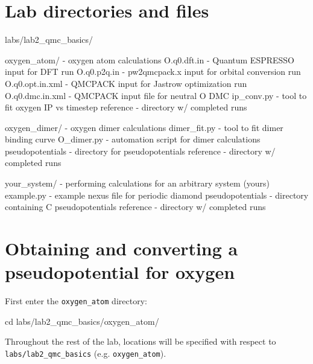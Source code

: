 \section{Lab directories and files}

\begin{shade}
labs/lab2_qmc_basics/

   oxygen_atom/             - oxygen atom calculations 
       O.q0.dft.in          - Quantum ESPRESSO input for DFT run
       O.q0.p2q.in          - pw2qmcpack.x input for orbital conversion run
       O.q0.opt.in.xml      - QMCPACK input for Jastrow optimization run
       O.q0.dmc.in.xml      - QMCPACK input file for neutral O DMC
       ip_conv.py           - tool to fit oxygen IP vs timestep
       reference            - directory w/ completed runs
   
   oxygen_dimer/            - oxygen dimer calculations
       dimer_fit.py         - tool to fit dimer binding curve
       O_dimer.py           - automation script for dimer calculations
       pseudopotentials     - directory for pseudopotentials
       reference            - directory w/ completed runs
   
   your_system/             - performing calculations for an arbitrary system (yours)
       example.py           - example nexus file for periodic diamond
       pseudopotentials     - directory containing C pseudopotentials
       reference            - directory w/ completed runs

\end{shade}





\section{Obtaining and converting a pseudopotential for oxygen}
\label{sec:lqb_pseudo}
First enter the \texttt{oxygen\_atom} directory:
\begin{shade}
cd labs/lab2_qmc_basics/oxygen_atom/
\end{shade}
\noindent
Throughout the rest of the lab, locations will be specified with respect to \texttt{labs/lab2\_qmc\_basics} (e.g. \texttt{oxygen\_atom}).

